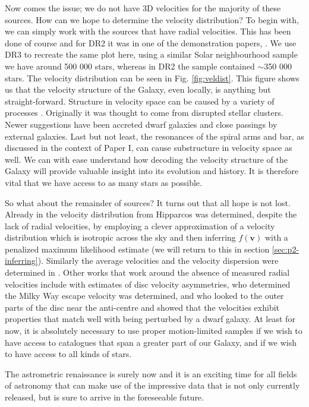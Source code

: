 Now comes the issue; we do not have 3D velocities for the majority of these sources. How can we hope to determine the velocity distribution? To begin with, we can simply work with the sources that have radial velocities. This has been done of course and for DR2 it was in one of the demonstration papers, \citep{dr2:kinematics}. We use DR3 to recreate the same plot here, using a similar Solar neighbourhood sample we have around 500 000 stars, whereas in DR2 the sample contained {$\sim$}350 000 stars. The velocity distribution can be seen in Fig. \ref{fig:veldist}. This figure shows us that the velocity structure of the Galaxy, even locally, is anything but straight-forward. Structure in velocity space can be caused by a variety of processes \citep[see, e.g.,][]{antoja:10a}. Originally it was thought to come from disrupted stellar clusters. Newer suggestions have been accreted dwarf galaxies and close passings by external galaxies. Last but not least, the resonances of the spiral arms and bar, as discussed in the context of Paper I, can cause substructure in velocity space as well. We can with ease understand how decoding the velocity structure of the Galaxy will provide valuable insight into its evolution and history. It is therefore vital that we have access to as many stars as possible.

So what about the remainder of sources? It turns out that all hope is not lost. Already in \cite{dehnen:98a} the velocity distribution from Hipparcos was determined, despite the lack of radial velocities, by employing a clever approximation of a velocity distribution which is isotropic across the sky and then inferring $f(\bm{v})$ with a penalized maximum likelihood estimate (we will return to this in section \ref{sec:p2-inferring}). Similarly the average velocities and the velocity dispersion were determined in \cite{dehnen:98b}. Other works that work around the absence of measured radial velocities include \cite{antoja:17} with estimates of disc velocity asymmetries, \cite{koppelman:21} who determined the Milky Way escape velocity was determined, and \cite{mcmillan:22} who looked to the outer parts of the disc near the anti-centre and showed that the velocities exhibit properties that match well with being perturbed by a dwarf galaxy. At least for now, it is absolutely necessary to use proper motion-limited samples if we wish to have access to catalogues that span a greater part of our Galaxy, and if we wish to have access to all kinds of stars. 

The astrometric renaissance is surely now and it is an exciting time for all fields of astronomy that can make use of the impressive data that is not only currently released, but is sure to arrive in the foreseeable future.
